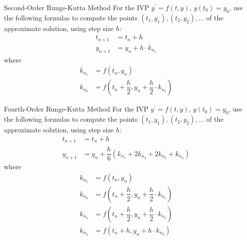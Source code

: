 \documentclass{beamer}
\begin{document}
\begin{frame}
\begin{block}{Second-Order Runge-Kutta Method}
For the IVP $y^\prime=f(t,y)$, $y(t_0)=y_0$, use the following formulas to compute the points $(t_1,y_1), (t_2,y_2),\dots$ of the approximate solution, using step size $h$:
\begin{align*}
t_{n+1}&=t_n+h\\
y_{n+1}&=y_n+h\cdot k_{n_1}
\end{align*}
where
\begin{align*}
k_{n_1}&=f(t_n,y_n)\\
k_{n_2}&=f\left(t_n+\dfrac{h}{2},y_n+\dfrac{h}{2}\cdot k_{n_1}\right)
\end{align*}
\end{block}
\end{frame}

\begin{frame}
\begin{block}{Fourth-Order Runge-Kutta Method}
For the IVP $y^\prime=f(t,y)$, $y(t_0)=y_0$, use the following formulas to compute the points $(t_1,y_1), (t_2,y_2),\dots$ of the approximate solution, using step size $h$:
\begin{align*}
t_{n+1}&=t_n+h\\
y_{n+1}&=y_n+\dfrac{h}{6}(k_{n_1}+2k_{n_2}+2k_{n_3}+k_{n_4})
\end{align*}
where
\begin{equation*}
\begin{aligned}
k_{n_1}&=f(t_n,y_n)\\
k_{n_2}&=f\left(t_n+\dfrac{h}{2},y_n+\dfrac{h}{2}\cdot k_{n_1}\right)\\
k_{n_3}&=f\left(t_n+\dfrac{h}{2},y_n+\dfrac{h}{2}\cdot k_{n_2}\right)\\
k_{n_4}&=f\left(t_n+h,y_n+h\cdot k_{n_3}\right)
\end{aligned}
\end{equation*}
\end{block}
\end{frame}
\end{document}
